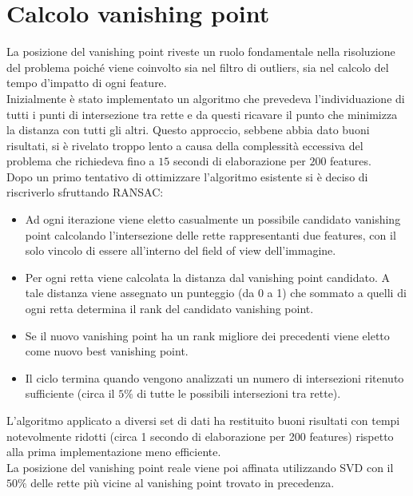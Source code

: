 \documentclass[12pt]{report}
\begin{document}
\section{Calcolo vanishing point}
\noindent La posizione del vanishing point riveste un ruolo fondamentale nella risoluzione del problema poich\'e viene coinvolto sia nel filtro di outliers, sia nel calcolo del tempo d'impatto di ogni feature.\\

\noindent Inizialmente \`e stato implementato un algoritmo che prevedeva l'individuazione di tutti i punti di intersezione tra rette e da questi ricavare il punto che minimizza la distanza con tutti gli altri. Questo approccio, sebbene abbia dato buoni risultati, si \`e rivelato troppo lento a causa della complessit\`a eccessiva del problema che richiedeva fino a $15$ secondi di elaborazione per $200$ features.\\

\noindent Dopo un primo tentativo di ottimizzare l'algoritmo esistente si \`e deciso di riscriverlo sfruttando RANSAC:
\begin{itemize}
	\item	Ad ogni iterazione viene eletto casualmente un possibile candidato vanishing point calcolando l'intersezione delle rette rappresentanti due features, con il solo vincolo di essere all'interno del field of view dell'immagine.
	\item	Per ogni retta viene calcolata la distanza dal vanishing point candidato. A tale distanza viene assegnato un punteggio (da 0 a 1) che sommato a quelli di ogni retta determina il rank del candidato vanishing point.
	\item	Se il nuovo vanishing point ha un rank migliore dei precedenti viene eletto come nuovo best vanishing point.
	\item	Il ciclo termina quando vengono analizzati un numero di intersezioni ritenuto sufficiente (circa il $5\%$ di tutte le possibili intersezioni tra rette).
\end{itemize}

\noindent L'algoritmo applicato a diversi set di dati ha restituito buoni risultati con tempi notevolmente ridotti (circa 1 secondo di elaborazione per 200 features) rispetto alla prima implementazione meno efficiente.\\

\noindent La posizione del vanishing point reale viene poi affinata utilizzando SVD con il $50\%$ delle rette pi\`u vicine al vanishing point trovato in precedenza. 
\end{document}
